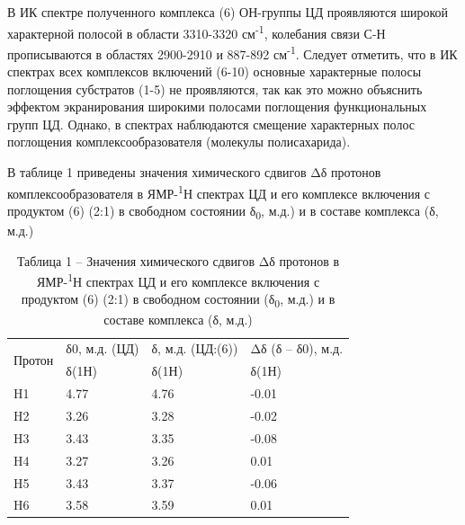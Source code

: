 \begin{multicols}{2}
В ИК спектре полученного комплекса (6) ОН-группы ЦД проявляются широкой
характерной полосой в области 3310-3320 см\textsuperscript{-1},
колебания связи С-Н прописываются в областях 2900-2910 и 887-892
см\textsuperscript{-1}. Следует отметить, что в ИК спектрах всех
комплексов включений (6-10) основные характерные полосы поглощения
субстратов (1-5) не проявляются, так как это можно объяснить эффектом
экранирования широкими полосами поглощения функциональных групп ЦД.
Однако, в спектрах наблюдаются смещение характерных полос поглощения
комплексообразователя (молекулы полисахарида).

В таблице 1 приведены значения химического сдвигов Δδ протонов
комплексообразователя в ЯМР-\textsuperscript{1}Н спектрах ЦД и его
комплексе включения с продуктом (6) (2:1) в свободном состоянии
δ\textsubscript{0}, м.д.) и в составе комплекса (δ, м.д.)
\end{multicols}

\begin{table}[H]
\centering
\caption*{Таблица 1 -- Значения химического сдвигов Δδ протонов в ЯМР-\textsuperscript{1}Н спектрах ЦД и его комплексе включения с продуктом (6) (2:1) в свободном состоянии (δ\textsubscript{0}, м.д.) и в составе комплекса (δ, м.д.)}
\begin{tabular}{|l|l|l|l|}
\hline
\multirow{2}{*}{Протон} & δ0, м.д.  (ЦД) & δ, м.д.   (ЦД:(6)) & Δδ (δ – δ0), м.д. \\ \cline{2-4} 
 & δ(1Н) & δ(1Н) & δ(1Н) \\ \hline
H1 & 4.77 & 4.76 & -0.01 \\ \hline
H2 & 3.26 & 3.28 & -0.02 \\ \hline
H3 & 3.43 & 3.35 & -0.08 \\ \hline
H4 & 3.27 & 3.26 & 0.01 \\ \hline
H5 & 3.43 & 3.37 & -0.06 \\ \hline
H6 & 3.58 & 3.59 & 0.01 \\ \hline
\end{tabular}
\end{table}

